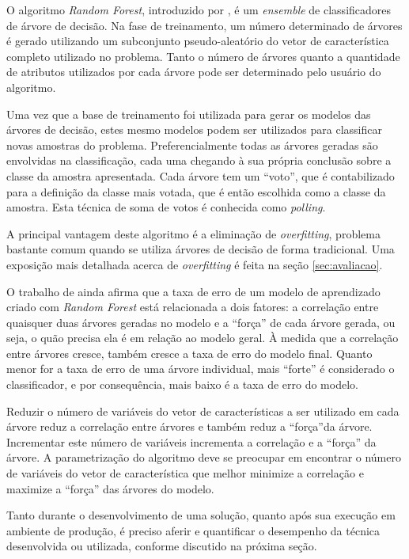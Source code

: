 O algoritmo \textit{Random Forest}, introduzido por  , é um \textit{ensemble} de classificadores de árvore de decisão. Na fase de treinamento, um número determinado de árvores é gerado utilizando um subconjunto pseudo-aleatório do vetor de característica completo utilizado no problema. Tanto o número de árvores quanto a quantidade de atributos utilizados por cada árvore pode ser determinado pelo usuário do algoritmo.

Uma vez que a base de treinamento foi utilizada para gerar os modelos das árvores de decisão, estes mesmo modelos podem ser utilizados para classificar novas amostras do problema. Preferencialmente todas as árvores geradas são envolvidas na classificação, cada uma chegando à sua própria conclusão sobre a classe da amostra apresentada. Cada árvore tem um ``voto'', que é contabilizado para a definição da classe mais votada, que é então escolhida como a classe da amostra. Esta técnica de soma de votos é conhecida como \textit{polling}.

A principal vantagem deste algoritmo é a eliminação de \textit{overfitting}, problema bastante comum quando se utiliza árvores de decisão de forma tradicional. Uma exposição mais detalhada acerca de \textit{overfitting} é feita na seção \ref{sec:avaliacao}.

O trabalho de  ainda afirma que a taxa de erro de um modelo de aprendizado criado com \textit{Random Forest} está relacionada a dois fatores: a correlação entre quaisquer duas árvores geradas no modelo e a ``força'' de cada árvore gerada, ou seja, o quão precisa ela é em relação ao modelo geral. À medida que a correlação entre árvores cresce, também cresce a taxa de erro do modelo final. Quanto menor for a taxa de erro de uma árvore individual, mais ``forte'' é considerado o classificador, e por consequência, mais baixo é a taxa de erro do modelo.

Reduzir o número de variáveis do vetor de características a ser utilizado em cada árvore reduz a correlação entre árvores e também reduz a ``força''da árvore. Incrementar este número de variáveis incrementa a correlação e a ``força'' da árvore. A parametrização do algoritmo deve se preocupar em encontrar o número de variáveis do vetor de característica que melhor minimize a correlação e maximize a ``força'' das árvores do modelo.

Tanto durante o desenvolvimento de uma solução, quanto após sua execução em ambiente de produção, é preciso aferir e quantificar o desempenho da técnica desenvolvida ou utilizada, conforme discutido na próxima seção.


